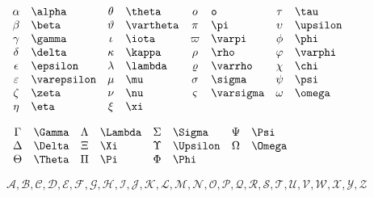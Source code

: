 \documentclass{article}
\begin{document}
    \begin{math}
        \begin{array}{clclclcl}
            \alpha & \verb=\alpha= & \theta & \verb=\theta= &  o & \verb=o=  & \tau & \verb=\tau= \\
            \beta & \verb=\beta= & \vartheta & \verb=\vartheta= & \pi & \verb=\pi= & \upsilon & \verb=\upsilon= \\
            \gamma & \verb=\gamma= & \iota & \verb=\iota= & \varpi & \verb=\varpi= & \phi & \verb=\phi= \\
            \delta & \verb=\delta= & \kappa & \verb=\kappa= & \rho & \verb=\rho= & \varphi & \verb=\varphi= \\
            \epsilon & \verb=\epsilon= & \lambda & \verb=\lambda= & \varrho & \verb=\varrho= & \chi & \verb=\chi= \\ 
            \varepsilon & \verb=\varepsilon= & \mu & \verb=\mu= & \sigma & \verb=\sigma= & \psi & \verb=\psi= \\ 
            \zeta & \verb=\zeta= & \nu & \verb=\nu= & \varsigma & \verb=\varsigma= & \omega & \verb=\omega= \\
            \eta & \verb=\eta= & \xi & \verb=\xi=
        \end{array}
    \end{math}

    \begin{math}
        \begin{array}{clclclcl}
            \Gamma & \verb=\Gamma= & \Lambda & \verb=\Lambda= & \Sigma & \verb=\Sigma= & \Psi & \verb=\Psi= \\
            \Delta & \verb=\Delta= & \Xi & \verb=\Xi= & \Upsilon & \verb=\Upsilon= & \Omega & \verb=\Omega= \\
            \Theta & \verb=\Theta= & \Pi & \verb=\Pi= & \Phi & \verb=\Phi= \\
        \end{array}
    \end{math}

    \begin{math}
        \mathcal{A,B,C,D,E,F,G,H,I,J,K,L,M,N,O,P,Q,R,S,T,U,V,W,X,Y,Z}
    \end{math}
\end{document}
